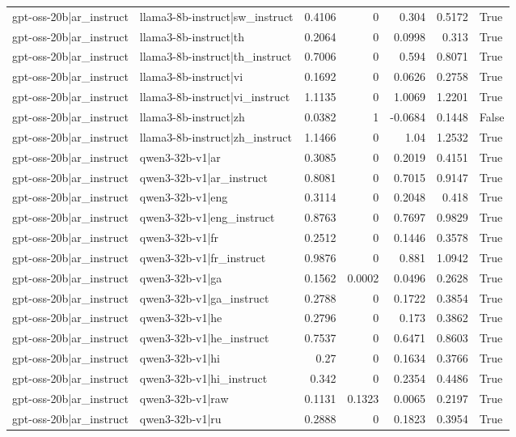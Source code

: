 \begin{table}
\begin{tabular}{l l r r r r l}
gpt-oss-20b|ar_instruct & llama3-8b-instruct|sw_instruct & 0.4106 & 0 & 0.304 & 0.5172 & True \\
gpt-oss-20b|ar_instruct & llama3-8b-instruct|th & 0.2064 & 0 & 0.0998 & 0.313 & True \\
gpt-oss-20b|ar_instruct & llama3-8b-instruct|th_instruct & 0.7006 & 0 & 0.594 & 0.8071 & True \\
gpt-oss-20b|ar_instruct & llama3-8b-instruct|vi & 0.1692 & 0 & 0.0626 & 0.2758 & True \\
gpt-oss-20b|ar_instruct & llama3-8b-instruct|vi_instruct & 1.1135 & 0 & 1.0069 & 1.2201 & True \\
gpt-oss-20b|ar_instruct & llama3-8b-instruct|zh & 0.0382 & 1 & -0.0684 & 0.1448 & False \\
gpt-oss-20b|ar_instruct & llama3-8b-instruct|zh_instruct & 1.1466 & 0 & 1.04 & 1.2532 & True \\
gpt-oss-20b|ar_instruct & qwen3-32b-v1|ar & 0.3085 & 0 & 0.2019 & 0.4151 & True \\
gpt-oss-20b|ar_instruct & qwen3-32b-v1|ar_instruct & 0.8081 & 0 & 0.7015 & 0.9147 & True \\
gpt-oss-20b|ar_instruct & qwen3-32b-v1|eng & 0.3114 & 0 & 0.2048 & 0.418 & True \\
gpt-oss-20b|ar_instruct & qwen3-32b-v1|eng_instruct & 0.8763 & 0 & 0.7697 & 0.9829 & True \\
gpt-oss-20b|ar_instruct & qwen3-32b-v1|fr & 0.2512 & 0 & 0.1446 & 0.3578 & True \\
gpt-oss-20b|ar_instruct & qwen3-32b-v1|fr_instruct & 0.9876 & 0 & 0.881 & 1.0942 & True \\
gpt-oss-20b|ar_instruct & qwen3-32b-v1|ga & 0.1562 & 0.0002 & 0.0496 & 0.2628 & True \\
gpt-oss-20b|ar_instruct & qwen3-32b-v1|ga_instruct & 0.2788 & 0 & 0.1722 & 0.3854 & True \\
gpt-oss-20b|ar_instruct & qwen3-32b-v1|he & 0.2796 & 0 & 0.173 & 0.3862 & True \\
gpt-oss-20b|ar_instruct & qwen3-32b-v1|he_instruct & 0.7537 & 0 & 0.6471 & 0.8603 & True \\
gpt-oss-20b|ar_instruct & qwen3-32b-v1|hi & 0.27 & 0 & 0.1634 & 0.3766 & True \\
gpt-oss-20b|ar_instruct & qwen3-32b-v1|hi_instruct & 0.342 & 0 & 0.2354 & 0.4486 & True \\
gpt-oss-20b|ar_instruct & qwen3-32b-v1|raw & 0.1131 & 0.1323 & 0.0065 & 0.2197 & True \\
gpt-oss-20b|ar_instruct & qwen3-32b-v1|ru & 0.2888 & 0 & 0.1823 & 0.3954 & True \\

\end{tabular}
\end{table}

